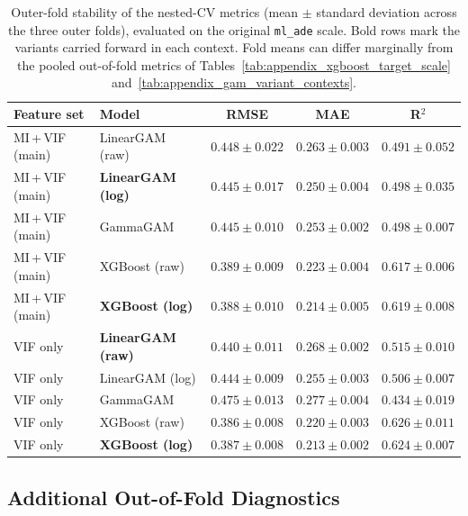 \documentclass[12pt]{article}
\begin{document}
\begin{table}[H]
  \centering
  \caption[Outer-fold stability of the nested-CV metrics]{Outer-fold stability of the nested-CV metrics (mean $\pm$ standard deviation across the three outer folds), evaluated on the original \texttt{ml\_ade} scale. Bold rows mark the variants carried forward in each context. Fold means can differ marginally from the pooled out-of-fold metrics of Tables~\ref{tab:appendix_xgboost_target_scale} and~\ref{tab:appendix_gam_variant_contexts}.}
  \label{tab:appendix_nested_cv_stability}
  \small
  \renewcommand{\arraystretch}{1.12}
  \begin{tabular}{llccc}
    \toprule
    \textbf{Feature set} & \textbf{Model} & \textbf{RMSE} & \textbf{MAE} & \textbf{R$^2$} \\
    \midrule
    MI\,+\,VIF (main) & LinearGAM (raw)  & $0.448 \pm 0.022$ & $0.263 \pm 0.003$ & $0.491 \pm 0.052$ \\
    MI\,+\,VIF (main) & \textbf{LinearGAM (log)} & $0.445 \pm 0.017$ & $0.250 \pm 0.004$ & $0.498 \pm 0.035$ \\
    MI\,+\,VIF (main) & GammaGAM         & $0.445 \pm 0.010$ & $0.253 \pm 0.002$ & $0.498 \pm 0.007$ \\
    MI\,+\,VIF (main) & XGBoost (raw)    & $0.389 \pm 0.009$ & $0.223 \pm 0.004$ & $0.617 \pm 0.006$ \\
    MI\,+\,VIF (main) & \textbf{XGBoost (log)} & $0.388 \pm 0.010$ & $0.214 \pm 0.005$ & $0.619 \pm 0.008$ \\
    \midrule
    VIF only          & \textbf{LinearGAM (raw)} & $0.440 \pm 0.011$ & $0.268 \pm 0.002$ & $0.515 \pm 0.010$ \\
    VIF only          & LinearGAM (log)  & $0.444 \pm 0.009$ & $0.255 \pm 0.003$ & $0.506 \pm 0.007$ \\
    VIF only          & GammaGAM         & $0.475 \pm 0.013$ & $0.277 \pm 0.004$ & $0.434 \pm 0.019$ \\
    VIF only          & XGBoost (raw)    & $0.386 \pm 0.008$ & $0.220 \pm 0.003$ & $0.626 \pm 0.011$ \\
    VIF only          & \textbf{XGBoost (log)} & $0.387 \pm 0.008$ & $0.213 \pm 0.002$ & $0.624 \pm 0.007$ \\
    \bottomrule
  \end{tabular}
\end{table}

\subsection{Additional Out-of-Fold Diagnostics}
\label{app:oof_diagnostics}
\end{document}
